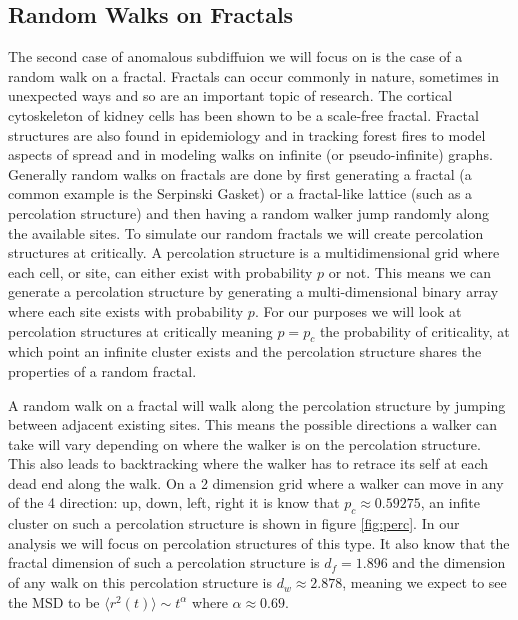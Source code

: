 \documentclass[%
 reprint,
 amsmath,amssymb,
 aps,
]{revtex4-2}
\begin{document}
\subsection{Random Walks on Fractals}
The second case of anomalous subdiffuion we will focus on is the case of a random walk on a fractal. Fractals can occur commonly in nature, sometimes in unexpected ways and so are an important topic of research. The cortical cytoskeleton of kidney cells has been shown to be a scale-free fractal\cite{krapf_strange_2019}. Fractal structures are also found in epidemiology and in tracking forest fires to model aspects of spread \cite{buldyrev_fractals_2009} and in modeling walks on infinite (or pseudo-infinite) graphs\cite{masuda_random_2017}. Generally random walks on fractals are done by first generating a fractal (a common example is the Serpinski Gasket) or a fractal-like lattice (such as a percolation structure) and then having a random walker jump randomly along the available sites\cite{ben-avraham_diffusion_2000, dauriac_random_1983}. To simulate our random fractals we will create percolation structures at critically. A percolation structure is a multidimensional grid where each cell, or site, can either exist with probability $p$ or not. This means we can generate a percolation structure by generating a multi-dimensional binary array where each site exists with probability $p$. For our purposes we will look at percolation structures at critically meaning $p=p_c$ the probability of criticality, at which point an infinite cluster exists and the percolation structure shares the properties of a random fractal\cite{ben-avraham_diffusion_2000}.

A random walk on a fractal will walk along the percolation structure by jumping between adjacent existing sites. This means the possible directions a walker can take will vary depending on where the walker is on the percolation structure. This also leads to backtracking where the walker has to retrace its self at each dead end along the walk. On a 2 dimension grid where a walker can move in any of the 4 direction: up, down, left, right it is know that $p_c\approx 0.59275$, an infite cluster on such a percolation structure is shown in figure \ref{fig:perc}. In our analysis we will focus on percolation structures of this type. It also know that the fractal dimension of such a percolation structure is $d_f=1.896$ and the dimension of any walk on this percolation structure is $d_w\approx 2.878$, meaning we expect to see the MSD to be $\langle r^2(t)\rangle\sim t^{\alpha}$ where $\alpha\approx 0.69$\cite{ben-avraham_diffusion_2000}.
\end{document}
